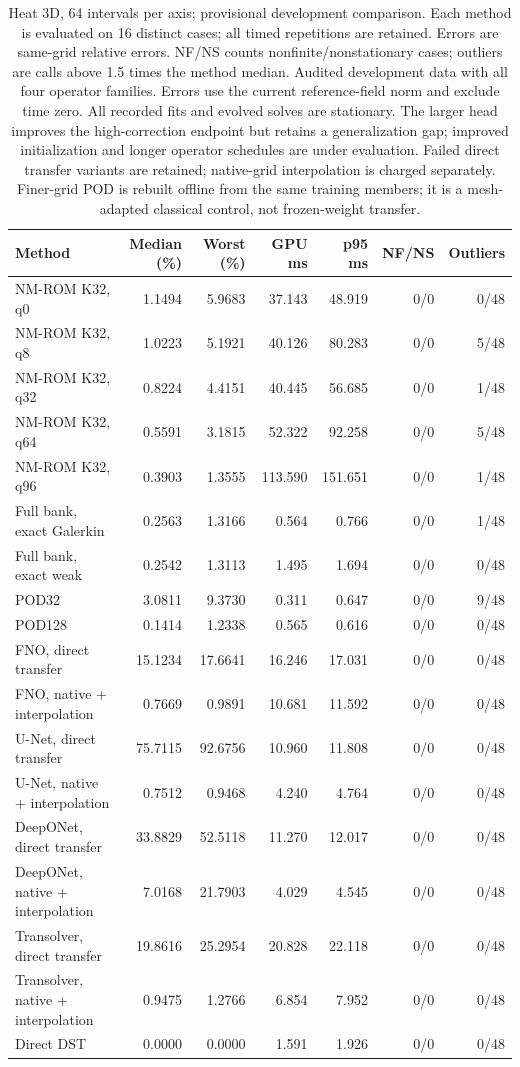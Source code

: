 \begin{table}[htbp]
\centering
\small
\setlength{\tabcolsep}{3pt}
\begin{tabular}{lrrrrrr}
\toprule
Method & Median (\%) & Worst (\%) & GPU ms & p95 ms & NF/NS & Outliers \\
\midrule
NM-ROM K32, q0 & 1.1494 & 5.9683 & 37.143 & 48.919 & 0/0 & 0/48 \\
NM-ROM K32, q8 & 1.0223 & 5.1921 & 40.126 & 80.283 & 0/0 & 5/48 \\
NM-ROM K32, q32 & 0.8224 & 4.4151 & 40.445 & 56.685 & 0/0 & 1/48 \\
NM-ROM K32, q64 & 0.5591 & 3.1815 & 52.322 & 92.258 & 0/0 & 5/48 \\
NM-ROM K32, q96 & 0.3903 & 1.3555 & 113.590 & 151.651 & 0/0 & 1/48 \\
Full bank, exact Galerkin & 0.2563 & 1.3166 & 0.564 & 0.766 & 0/0 & 1/48 \\
Full bank, exact weak & 0.2542 & 1.3113 & 1.495 & 1.694 & 0/0 & 0/48 \\
POD32 & 3.0811 & 9.3730 & 0.311 & 0.647 & 0/0 & 9/48 \\
POD128 & 0.1414 & 1.2338 & 0.565 & 0.616 & 0/0 & 0/48 \\
FNO, direct transfer & 15.1234 & 17.6641 & 16.246 & 17.031 & 0/0 & 0/48 \\
FNO, native + interpolation & 0.7669 & 0.9891 & 10.681 & 11.592 & 0/0 & 0/48 \\
U-Net, direct transfer & 75.7115 & 92.6756 & 10.960 & 11.808 & 0/0 & 0/48 \\
U-Net, native + interpolation & 0.7512 & 0.9468 & 4.240 & 4.764 & 0/0 & 0/48 \\
DeepONet, direct transfer & 33.8829 & 52.5118 & 11.270 & 12.017 & 0/0 & 0/48 \\
DeepONet, native + interpolation & 7.0168 & 21.7903 & 4.029 & 4.545 & 0/0 & 0/48 \\
Transolver, direct transfer & 19.8616 & 25.2954 & 20.828 & 22.118 & 0/0 & 0/48 \\
Transolver, native + interpolation & 0.9475 & 1.2766 & 6.854 & 7.952 & 0/0 & 0/48 \\
Direct DST & 0.0000 & 0.0000 & 1.591 & 1.926 & 0/0 & 0/48 \\
\bottomrule
\end{tabular}
\caption{Heat 3D, 64 intervals per axis; provisional development comparison. Each method is evaluated on 16 distinct cases; all timed repetitions are retained. Errors are same-grid relative errors. NF/NS counts nonfinite/nonstationary cases; outliers are calls above 1.5 times the method median. Audited development data with all four operator families. Errors use the current reference-field norm and exclude time zero. All recorded fits and evolved solves are stationary. The larger head improves the high-correction endpoint but retains a generalization gap; improved initialization and longer operator schedules are under evaluation. Failed direct transfer variants are retained; native-grid interpolation is charged separately. Finer-grid POD is rebuilt offline from the same training members; it is a mesh-adapted classical control, not frozen-weight transfer.}
\label{tab:heat3d-extra03-n64}
\end{table}
